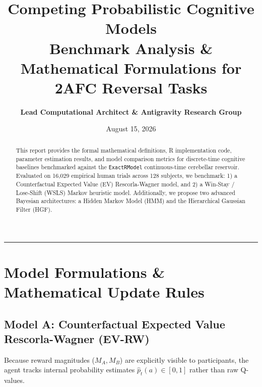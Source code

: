 \documentclass[11pt,a4paper]{article}
\title{\Huge \textbf{\color{navyblue} Competing Probabilistic Cognitive Models}\\[0.4em]
\large Benchmark Analysis \& Mathematical Formulations for 2AFC Reversal Tasks}
\author{\textbf{Lead Computational Architect \& Antigravity Research Group}}
\date{August 15, 2026}
\begin{document}
\maketitle

\begin{abstract}
This report provides the formal mathematical definitions, R implementation code, parameter estimation results, and model comparison metrics for discrete-time cognitive baselines benchmarked against the \texttt{ExactRModel} continuous-time cerebellar reservoir. Evaluated on 16,029 empirical human trials across 128 subjects, we benchmark: 1) a Counterfactual Expected Value (EV) Rescorla-Wagner model, and 2) a Win-Stay / Lose-Shift (WSLS) Markov heuristic model. Additionally, we propose two advanced Bayesian architectures: a Hidden Markov Model (HMM) and the Hierarchical Gaussian Filter (HGF).
\end{abstract}

\vspace{0.8em}
\hrule
\vspace{0.8em}

\section{Model Formulations \& Mathematical Update Rules}

\subsection{Model A: Counterfactual Expected Value Rescorla-Wagner (EV-RW)}
Because reward magnitudes ($M_A, M_B$) are explicitly visible to participants, the agent tracks internal probability estimates $\hat{p}_t(a) \in [0, 1]$ rather than raw Q-values. 
\end{document}
